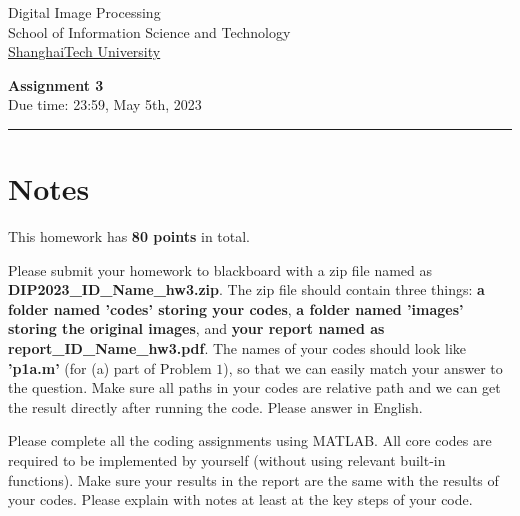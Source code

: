\documentclass[11pt,letterpaper]{article}
\begin{document}

\usetikzlibrary{positioning}
\pagestyle{plain}
\begin{flushleft}
Digital Image Processing\\
School of Information Science and Technology\\
\underline{ShanghaiTech University}
\end{flushleft}

 
\begin{center}\vspace{-1cm}
\textbf{\large Assignment 3}\\  
Due time: 23:59,	May 5th,	2023\\
\end{center}
\rule{\linewidth}{0.1mm}

\section{Notes}
This homework has \textbf{80 points} in total. \par
Please submit your homework to blackboard with a zip file named as \textcolor[rgb]{1,0,0}{\textbf{DIP2023\_ID\_Name\_hw3.zip}}. The zip file should contain three things: \textcolor[rgb]{1,0,0}{\textbf{a folder named 'codes' storing your codes}},  \textcolor[rgb]{1,0,0}{\textbf{a folder named 'images' storing the original images}}, and \textcolor[rgb]{1,0,0}{\textbf{your report named as report\_ID\_Name\_hw3.pdf}}. The names of your codes should look like \textcolor[rgb]{1,0,0}{\textbf{'p1a.m'}} (for (a) part of Problem $1$), so that we can easily match your answer to the question. \textcolor[rgb]{1,0,0}{Make sure all paths in your codes are relative path and we can get the result directly after running the code}. Please answer in \textcolor[rgb]{1,0,0}{English}. \par

Please complete all the coding assignments using \textcolor[rgb]{1,0,0}{MATLAB}. All core codes are required to be implemented \textcolor[rgb]{1,0,0}{by yourself} (without using relevant built-in functions). Make sure your results in the report are the same with the results of your codes. Please explain with notes at least at the key steps of your code.
\end{document}
